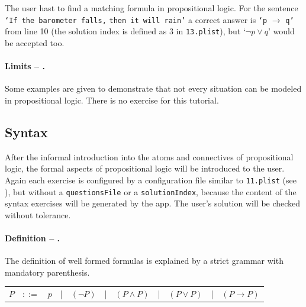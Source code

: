 The user hast to find a matching formula in propositional logic.
For the sentence
\verb+‘If the barometer falls,+ \verb+then it will rain’+ 
a correct answer is
\verb+‘p+ $\rightarrow$ \verb+q’+ 
from line 10 
(the solution index is defined as 3 in \verb+13.plist+),
but 
‘$\neg p \vee q$’ would be accepted too.

\paragraph{Limits – .}
\label{tut:14}
Some examples are given to demonstrate that not every situation can be modeled in propositional logic. 
There is no exercise for this tutorial.

\subsection{Syntax}

After the informal introduction into the atoms and connectives of propositional logic, 
the formal aspects of propositional logic will be introduced to the user.
Again each exercise is configured by a configuration file similar to 
\verb+11.plist+ (see ),
but without a \verb+questionsFile+ or a \verb+solutionIndex+,
because the content of the syntax exercises will be generated by the app.
The user's solution will be checked without tolerance.

\paragraph{Definition – .}
\label{tut:21}
The definition of well formed formulas is explained by a strict grammar with mandatory parenthesis.

\begin{center}
\begin{tabular}{rcccccccccc}
$P$	&$::=$	&$p$ 	
	&|		& $(\neg P)$ 
	&|		&  $(P \wedge P)$ 
	&|		&  $(P \vee P)$ 
	&|		&  $(P \rightarrow P)$ \\
\end{tabular}
\end{center}

